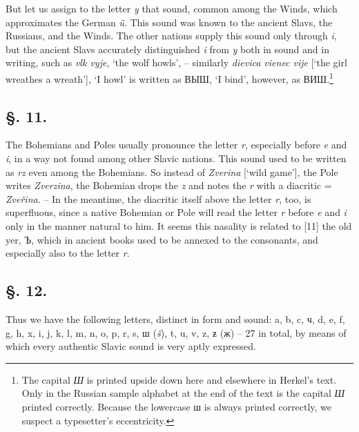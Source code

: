 But let us assign to the letter \textit{y} that sound, common among the Winds, which approximates the German \textit{ü}. This sound was known to the ancient Slavs, the Russians, and the Winds. The other nations supply this sound only through \textit{i}, but the ancient Slavs accurately distinguished \textit{i} from \textit{y} both in sound and in writing, such as \textit{vlk vyje}, ‘the wolf howls’, -- similarly \textit{dievica vienec vije} [‘the girl wreathes a wreath’], ‘I howl’ is written as ВЫШ, ‘I bind’, however, as ВИШ.\footnote{The capital \textit{Ш} is printed upside down here and elsewhere in Herkel’s text. Only in the Russian sample alphabet at the end of the text is the capital \textit{Ш} printed correctly. Because the lowercase ш is always printed correctly, we suspect a typesetter’s eccentricity.}

\subsection*{\hspace*{\fill}§. 11.\hspace*{\fill}}

The Bohemians and Poles usually pronounce the letter \textit{r}, especially before \textit{e} and \textit{i}, in a way not found among other Slavic nations. This sound used to be written as \textit{rz} even among the Bohemians. So instead of \textit{Zverina} [‘wild game’], the Pole writes \textit{Zverzina}, the Bohemian drops the \textit{z} and notes the \textit{r} with a diacritic = \textit{Zveřina}. -- In the meantime, the diacritic itself above the letter \textit{r}, too, is superfluous, since a native Bohemian or Pole will read the letter \textit{r} before \textit{e} and \textit{i} only in the manner natural to him. It seems this nasality is related to [11] the old yer, Ъ, which in ancient books used to be annexed to the consonants, and especially also to the letter \textit{r}.

\subsection*{\hspace*{\fill}§. 12.\hspace*{\fill}}

Thus we have the following letters, distinct in form and sound: a, b, c, ч, d, e, f, g, h, x, i, j, k, l, m, n, o, p, r, s, ш (\textit{š}), t, u, v, z, ƶ (ж) -- 27 in total, by means of which every authentic Slavic sound is very aptly expressed.

